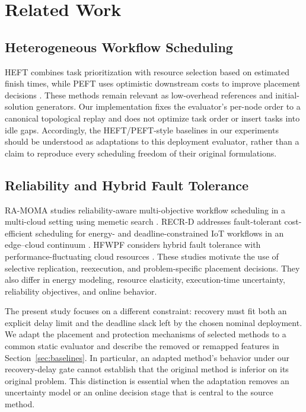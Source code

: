 \section{Related Work}
\label{sec:related_work}
\subsection{Heterogeneous Workflow Scheduling}
HEFT combines task prioritization with resource selection based on estimated
finish times, while PEFT uses optimistic downstream costs to improve
placement decisions \cite{topcuoglu2002heft,arabnejad2014peft}. These methods
remain relevant as low-overhead references and initial-solution generators.
Our implementation fixes the evaluator's per-node order to a canonical
topological replay and does not optimize task order or insert tasks into idle
gaps. Accordingly, the HEFT/PEFT-style baselines in our experiments should be
understood as adaptations to this deployment evaluator, rather than a claim
to reproduce every scheduling freedom of their original formulations.

\subsection{Reliability and Hybrid Fault Tolerance}
RA-MOMA studies reliability-aware multi-objective workflow scheduling in a
multi-cloud setting using memetic search \cite{qin2023ramoma}. RECR-D addresses
fault-tolerant cost-efficient scheduling for energy- and deadline-constrained
IoT workflows in an edge--cloud continuum \cite{taghinezhad2025recrd}. HFWPF
considers hybrid fault tolerance with performance-fluctuating cloud resources
\cite{ren2026hfwpf}. These studies motivate the use of selective replication,
reexecution, and problem-specific placement decisions. They also differ in
energy modeling, resource elasticity, execution-time uncertainty, reliability
objectives, and online behavior.

The present study focuses on a different constraint: recovery must fit both
an explicit delay limit and the deadline slack left by the chosen nominal
deployment. We adapt the placement and protection mechanisms of selected
methods to a common static evaluator and describe the removed or remapped
features in Section~\ref{sec:baselines}. In particular, an adapted method's
behavior under our recovery-delay gate cannot establish that the original
method is inferior on its original problem. This distinction is essential
when the adaptation removes an uncertainty model or an online decision stage
that is central to the source method.

